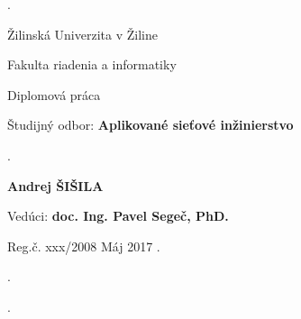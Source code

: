 \begin{titlepage}

\phantom.

\bigskip

\begin{center}
{\sc\LARGE Žilinská Univerzita v Žiline}
\medskip

{\sc\Large Fakulta riadenia a informatiky}

\vfill\vfill\vfill\vfill

{\sc\LARGE Diplomová práca}

\medskip

{\large Študijný odbor: {\bf Aplikované sieťové inžinierstvo}}
\end{center}


\vfill\vfill\vfill\vfill


\phantom.\hfill
\begin{center}
{\large\bf Andrej ŠIŠILA}

\medskip

{\large\bf \nazovpraceSK}

\medskip

Vedúci: {\bf doc. Ing. Pavel Segeč, PhD.}

\medskip
 
\hfill
Reg.č. xxx/2008 
\hfill
Máj 2017
\hfill\phantom.
\end{center}
\hspace{1.7cm}\phantom.

\vspace{2.9cm}

\phantom.
\end{titlepage}



\begin{abstract}

\noindent
{\sc Šišila Andrej:} {\em \nazovpraceSK}
[Diplomová práca] 

\noindent
Žilinská Univerzita v~Žiline,  
Fakulta riadenia a informatiky,  
Katedra informačných sietí.

\noindent  
Vedúci: doc. Ing. Pavel Segeč, PhD.
 
\noindent  
Stupeň odbornej kvalifikácie:
Inžinier v odbore Aplikované sieťové inžinierstvo, Žilina. 

\noindent
FRI ŽU v Žiline, 2017 TODO s.

\bigskip

Obsahom práce je ... TODO


\end{abstract}


